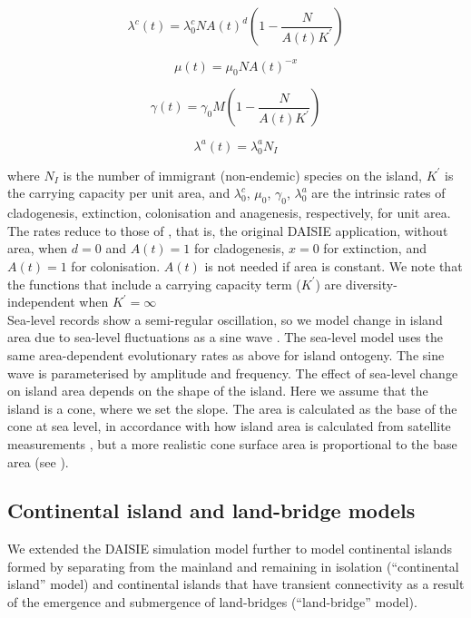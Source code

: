 \documentclass{article}
\begin{document}
\[ \lambda^c (t) = \lambda^c_0 N A(t)^d \left( 1- \frac{N}{A(t)K^\prime} \right) \]

\[ \mu (t) = \mu_0 N A(t)^{-x} \]

\[ \gamma (t) = \gamma_0 M \left( 1- \frac{N}{A(t)K^\prime} \right) \]
 
\[ \lambda^a (t) = \lambda^a_0 N_I \]

where $N_I$ is the number of immigrant (non-endemic) species on the island, $K^\prime$ is the carrying capacity per unit area, and $\lambda^c_0$, $\mu_0$, $\gamma_0$, $\lambda^a_0$ are the intrinsic rates of cladogenesis, extinction, colonisation and anagenesis, respectively, for unit area. The rates reduce to those of \cite{valente_equilibrium_2015}, that is, the original DAISIE application, without area, when $d = 0$ and $A(t) = 1$ for cladogenesis, $x = 0$ for extinction, and $A(t) = 1$ for colonisation. $A(t)$ is not needed if area is constant. We note that the functions that include a carrying capacity term ($K^\prime$) are diversity-independent when $K^\prime = \infty$ \\

Sea-level records show a semi-regular oscillation, so we model change in island area due to sea-level fluctuations as a sine wave \citep{miller_phanerozoic_2005, bintanja_modelled_2005}. The sea-level model uses the same area-dependent evolutionary rates as above for island ontogeny. The sine wave is parameterised by amplitude and frequency. The effect of sea-level change on island area depends on the shape of the island. Here we assume that the island is a cone, where we set the slope. The area is calculated as the base of the cone at sea level, in accordance with how island area is calculated from satellite measurements \citep{lim_true_2017, valente_simple_2020}, but a more realistic cone surface area is proportional to the base area (see ). \\

\subsection*{Continental island and land-bridge models}

We extended the DAISIE simulation model further to model continental islands formed by separating from the mainland and remaining in isolation (“continental island” model) and continental islands that have transient connectivity as a result of the emergence and submergence of land-bridges (“land-bridge” model). \\
\end{document}
